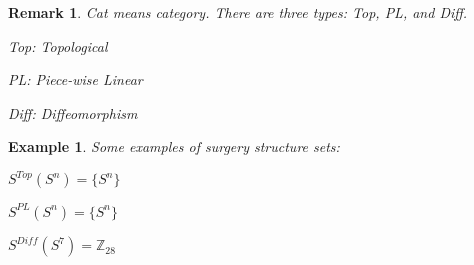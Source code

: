 \documentclass{article}
\theoremstyle{mystyle}
\newtheorem{example}{Example}[section]
\newtheorem{remark}{Remark}[section]
\begin{document}
\begin{remark}
Cat means category. There are three types: Top, PL, and Diff. 
    \begin{itemize}
        \begin{multicols}{3}
            \item Top: Topological
            \item PL: Piece-wise Linear
            \item Diff: Diffeomorphism
        \end{multicols}
    \end{itemize}
\end{remark}
\begin{example}
Some examples of surgery structure sets:
    \begin{enumerate}
        \begin{multicols}{3}
            \item $S^{Top}(S^{n})=\{S^{n}\}$
            \item $S^{PL}(S^{n}) = \{S^{n}\}$
            \item $S^{Diff}(S^{7}) = \mathbb{Z}_{28}$
        \end{multicols}
    \end{enumerate}
\end{example}
\end{document}
